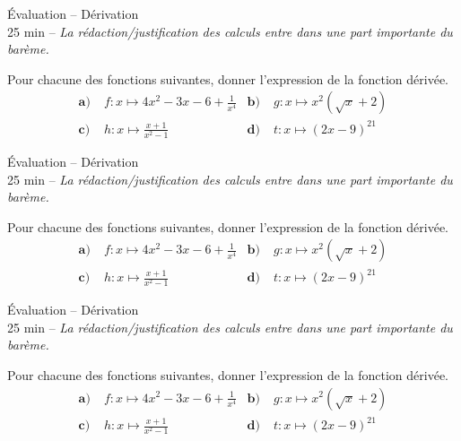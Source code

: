 \documentclass[11pt]{article}
\begin{document}
%
%
%

\begin{center}
  {\Huge Évaluation -- Dérivation}\\
  25 min -- \emph{La rédaction/justification des calculs entre dans une part
  importante du barème.}
\end{center}

\noindent Pour chacune des fonctions suivantes, donner l'expression de la fonction
dérivée.
\begin{align*}
  \textbf{a)}\; & f:x\mapsto 4x^2-3x-6+\frac{1}{x^4} &
  \textbf{b)}\; & g:x\mapsto x^2(\sqrt x+2) \\
  \textbf{c)}\; & h:x\mapsto \frac{x+1}{x^2-1} &
  \textbf{d)}\; & t:x\mapsto (2x-9)^{21}
\end{align*}
\vspace{2cm}

\begin{center}
  {\Huge Évaluation -- Dérivation}\\
  25 min -- \emph{La rédaction/justification des calculs entre dans une part
  importante du barème.}
\end{center}

\noindent Pour chacune des fonctions suivantes, donner l'expression de la fonction
dérivée.
\begin{align*}
  \textbf{a)}\; & f:x\mapsto 4x^2-3x-6+\frac{1}{x^4} &
  \textbf{b)}\; & g:x\mapsto x^2(\sqrt x+2) \\
  \textbf{c)}\; & h:x\mapsto \frac{x+1}{x^2-1} &
  \textbf{d)}\; & t:x\mapsto (2x-9)^{21}
\end{align*}
\vspace{2cm}

\begin{center}
  {\Huge Évaluation -- Dérivation}\\
  25 min -- \emph{La rédaction/justification des calculs entre dans une part
  importante du barème.}
\end{center}

\noindent Pour chacune des fonctions suivantes, donner l'expression de la fonction
dérivée.
\begin{align*}
  \textbf{a)}\; & f:x\mapsto 4x^2-3x-6+\frac{1}{x^4} &
  \textbf{b)}\; & g:x\mapsto x^2(\sqrt x+2) \\
  \textbf{c)}\; & h:x\mapsto \frac{x+1}{x^2-1} &
  \textbf{d)}\; & t:x\mapsto (2x-9)^{21}
\end{align*}
\vspace{2cm}
\end{document}
